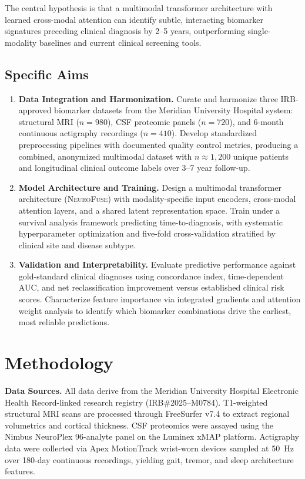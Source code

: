 \documentclass[10pt]{article}
\begin{document}
The central hypothesis is that a multimodal transformer architecture with learned cross-modal attention can identify subtle, interacting biomarker signatures preceding clinical diagnosis by 2--5 years, outperforming single-modality baselines and current clinical screening tools.

\subsection{Specific Aims}

\begin{enumerate}[leftmargin=*,label={\textbf{Aim \arabic*.}},itemsep=3pt]
  \item \textbf{Data Integration and Harmonization.} Curate and harmonize three IRB-approved biomarker datasets from the Meridian University Hospital system: structural MRI ($n = 980$), CSF proteomic panels ($n = 720$), and 6-month continuous actigraphy recordings ($n = 410$). Develop standardized preprocessing pipelines with documented quality control metrics, producing a combined, anonymized multimodal dataset with $n \approx 1{,}200$ unique patients and longitudinal clinical outcome labels over 3--7 year follow-up.

  \item \textbf{Model Architecture and Training.} Design a multimodal transformer architecture (\textsc{NeuroFuse}) with modality-specific input encoders, cross-modal attention layers, and a shared latent representation space. Train under a survival analysis framework predicting time-to-diagnosis, with systematic hyperparameter optimization and five-fold cross-validation stratified by clinical site and disease subtype.

  \item \textbf{Validation and Interpretability.} Evaluate predictive performance against gold-standard clinical diagnoses using concordance index, time-dependent AUC, and net reclassification improvement versus established clinical risk scores. Characterize feature importance via integrated gradients and attention weight analysis to identify which biomarker combinations drive the earliest, most reliable predictions.
\end{enumerate}

\section{Methodology}

\textbf{Data Sources.} All data derive from the Meridian University Hospital Electronic Health Record-linked research registry (IRB\#2025--M0784). T1-weighted structural MRI scans are processed through FreeSurfer v7.4 to extract regional volumetrics and cortical thickness. CSF proteomics were assayed using the Nimbus NeuroPlex 96-analyte panel on the Luminex xMAP platform. Actigraphy data were collected via Apex MotionTrack wrist-worn devices sampled at 50~Hz over 180-day continuous recordings, yielding gait, tremor, and sleep architecture features.
\end{document}
